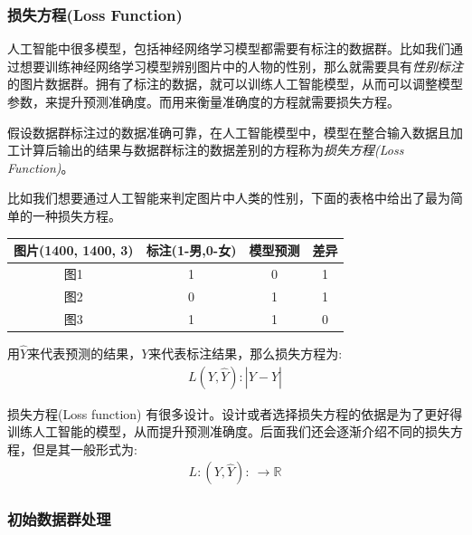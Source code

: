 \documentclass[12pt]{article}
\newcommand{\rn}{\mathbb{R}}
\numberwithin{figure}{section}
\numberwithin{equation}{section}
\begin{document}
\subsubsection{损失方程(Loss Function)}

人工智能中很多模型，包括神经网络学习模型都需要有标注的数据群。比如我们通过想要训练神经网络学习模型辨别图片中的人物的性别，那么就需要具有\textit{性别标注}的图片数据群。拥有了标注的数据，就可以训练人工智能模型，从而可以调整模型参数，来提升预测准确度。而用来衡量准确度的方程就需要损失方程。

\begin{definition}
	假设数据群标注过的数据准确可靠，在人工智能模型中，模型在整合输入数据且加工计算后输出的结果与数据群标注的数据差别的方程称为\textit{损失方程(Loss Function)}。
\end{definition}

\begin{example}
比如我们想要通过人工智能来判定图片中人类的性别，下面的表格中给出了最为简单的一种损失方程。
\begin{table}[H]
	\centering
	\renewcommand{\arraystretch}{1.5}
	\begin{tabular}{cccc}
	\hline 
		图片(1400, 1400, 3) & 标注(1-男,0-女) & 模型预测 & 差异\\
		\hline 
		图1 & 1 & 0 & 1 \\
		图2 & 0 & 1 & 1 \\
		图3 & 1 & 1 & 0 \\
		\hline 
	\end{tabular}
\end{table}
用$\hat{Y}$来代表预测的结果，$Y$来代表标注结果，那么损失方程为:
\begin{align*}
	L(Y, \hat{Y}): |Y-\hat{Y}| 
\end{align*}
\end{example}

\begin{remark}
损失方程(Loss function) 有很多设计。设计或者选择损失方程的依据是为了更好得训练人工智能的模型，从而提升预测准确度。后面我们还会逐渐介绍不同的损失方程，但是其一般形式为:
\begin{align*}
	L: (Y, \hat{Y}): \ \to \rn 
\end{align*}	
\end{remark}

\subsubsection{初始数据群处理}
\end{document}
